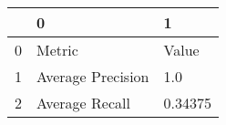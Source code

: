 \begin{tabular}{lll}
\toprule
{} &                  0 &        1 \\
\midrule
0 &             Metric &    Value \\
1 &  Average Precision &      1.0 \\
2 &     Average Recall &  0.34375 \\
\bottomrule
\end{tabular}
